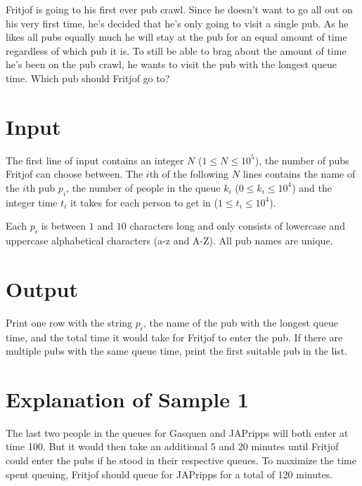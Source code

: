 
Fritjof is going to his first ever pub crawl. Since he doesn't want to go all out on his very first
time, he's decided that he's only going to visit a single pub. As he likes all pubs equally much he
will stay at the pub for an equal amount of time regardless of which pub it is. To still be able to
brag about the amount of time he's been on the pub crawl, he wants to visit the pub with the longest
queue time. Which pub should Fritjof go to?

\section*{Input}

The first line of input contains an integer $N$ ($1 \leq N \leq 10^5$), the number of pubs Fritjof
can choose between. The $i$th of the following $N$ lines contains the name of the $i$th pub $p_i$, the number of
people in the queue $k_i$ ($0 \leq k_i \leq 10^4$) and the integer time $t_i$ it takes for each person to get in
($1 \leq t_i \leq 10^4$).

Each $p_i$ is between $1$ and $10$ characters long and only consists of lowercase and uppercase
alphabetical characters (a-z and A-Z). All pub names are unique.

\section*{Output}

Print one row with the string $p_i$, the name of the pub with the longest queue time, and the total
time it would take for Fritjof to enter the pub. If there are multiple pubs with the same queue time,
print the first suitable pub in the list.

\section*{Explanation of Sample 1}

The last two people in the queues for Gasquen and JAPripps will both enter at time 100. But it would
then take an additional 5 and 20 minutes until Fritjof could enter the pubs if he stood in their
respective queues. To maximize the time spent queuing, Fritjof should queue for JAPripps for a total
of 120 minutes.
